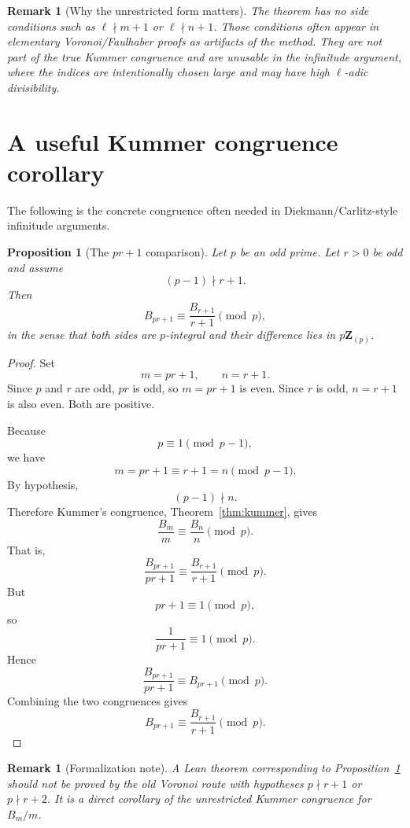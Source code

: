 \documentclass[11pt]{article}
\newtheorem{proposition}[theorem]{Proposition}
\newtheorem{remark}[theorem]{Remark}
\newcommand{\Z}{\mathbf Z}
\begin{document}
\begin{remark}[Why the unrestricted form matters]
The theorem has no side conditions such as $\ell\nmid m+1$ or $\ell\nmid n+1$.  Those conditions often appear in elementary Voronoi/Faulhaber proofs as artifacts of the method.  They are not part of the true Kummer congruence and are unusable in the infinitude argument, where the indices are intentionally chosen large and may have high $\ell$-adic divisibility.
\end{remark}

\section{A useful Kummer congruence corollary}\label{sec:dieckmann-corollary}

The following is the concrete congruence often needed in Diekmann/Carlitz-style infinitude arguments.

\begin{proposition}[The $pr+1$ comparison]\label{prop:prplusone}
Let $p$ be an odd prime.  Let $r>0$ be odd and assume
\[
  (p-1)\nmid r+1.
\]
Then
\[
  B_{pr+1}\equiv \frac{B_{r+1}}{r+1}\pmod p,
\]
in the sense that both sides are $p$-integral and their difference lies in $p\Z_{(p)}$.
\end{proposition}

\begin{proof}
Set
\[
  m=pr+1,
  \qquad
  n=r+1.
\]
Since $p$ and $r$ are odd, $pr$ is odd, so $m=pr+1$ is even.  Since $r$ is odd, $n=r+1$ is also even.  Both are positive.

Because
\[
  p\equiv 1\pmod{p-1},
\]
we have
\[
  m=pr+1\equiv r+1=n\pmod{p-1}.
\]
By hypothesis,
\[
  (p-1)\nmid n.
\]
Therefore Kummer's congruence, Theorem~\ref{thm:kummer}, gives
\[
  \frac{B_m}{m}\equiv \frac{B_n}{n}\pmod p.
\]
That is,
\[
  \frac{B_{pr+1}}{pr+1}\equiv \frac{B_{r+1}}{r+1}\pmod p.
\]
But
\[
  pr+1\equiv 1\pmod p,
\]
so
\[
  \frac{1}{pr+1}\equiv 1\pmod p.
\]
Hence
\[
  \frac{B_{pr+1}}{pr+1}\equiv B_{pr+1}\pmod p.
\]
Combining the two congruences gives
\[
  B_{pr+1}\equiv \frac{B_{r+1}}{r+1}\pmod p.
\]
\end{proof}

\begin{remark}[Formalization note]
A Lean theorem corresponding to Proposition~\ref{prop:prplusone} should not be proved by the old Voronoi route with hypotheses $p\nmid r+1$ or $p\nmid r+2$.  It is a direct corollary of the unrestricted Kummer congruence for $B_m/m$.
\end{remark}
\end{document}

